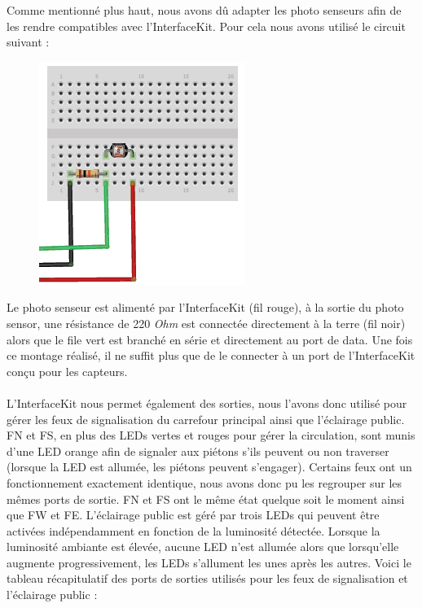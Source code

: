 Comme mentionné plus haut, nous avons dû adapter les photo senseurs afin de les rendre compatibles avec l’InterfaceKit. Pour cela nous avons utilisé le circuit suivant :
\begin{figure}[H]
    \begin{center}
        \includegraphics[scale=0.4,keepaspectratio]{img/circuit-photo-senseurs}
    \end{center}
\end{figure}
\vspace{-0.5cm}
Le photo senseur est alimenté par l’InterfaceKit (fil rouge), à la sortie du photo sensor, une résistance de 220 \textit{Ohm} est connectée directement à la terre (fil noir) alors que le file vert est branché en série et directement au port de data. Une fois ce montage réalisé, il ne suffit plus que de le connecter à un port de l’InterfaceKit conçu pour les capteurs.\\\\

L’InterfaceKit nous permet également des sorties, nous l’avons donc utilisé pour gérer les feux de signalisation du carrefour principal ainsi que l’éclairage public. FN et FS, en plus des LEDs vertes et rouges pour gérer la circulation, sont munis d’une LED orange afin de signaler aux piétons s’ils peuvent ou non traverser (lorsque la LED est allumée, les piétons peuvent s’engager). Certains feux ont un fonctionnement exactement identique, nous avons donc pu les regrouper sur les mêmes ports de sortie. FN et FS ont le même état quelque soit le moment ainsi que FW et FE.
L’éclairage public est géré par trois LEDs qui peuvent être activées indépendamment en fonction de la luminosité détectée. Lorsque la luminosité ambiante est élevée, aucune LED n’est allumée alors que lorsqu’elle augmente progressivement, les LEDs s’allument les unes après les autres.
Voici le tableau récapitulatif des ports de sorties utilisés pour les feux de signalisation et l’éclairage public :


